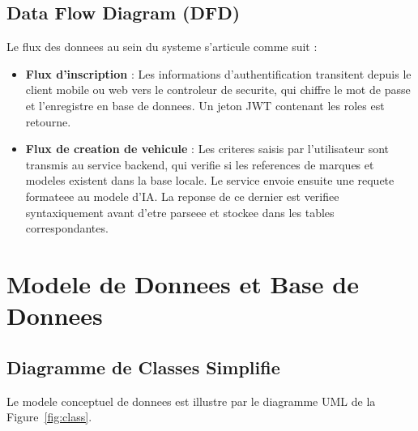\documentclass[11pt,a4paper]{report}
\begin{document}
\section{Data Flow Diagram (DFD)}
Le flux des donnees au sein du systeme s'articule comme suit :
\begin{itemize}[label=\textbullet]
    \item \textbf{Flux d'inscription} : Les informations d'authentification transitent depuis le client mobile ou web vers le controleur de securite, qui chiffre le mot de passe et l'enregistre en base de donnees. Un jeton JWT contenant les roles est retourne.
    \item \textbf{Flux de creation de vehicule} : Les criteres saisis par l'utilisateur sont transmis au service backend, qui verifie si les references de marques et modeles existent dans la base locale. Le service envoie ensuite une requete formateee au modele d'IA. La reponse de ce dernier est verifiee syntaxiquement avant d'etre parseee et stockee dans les tables correspondantes.
\end{itemize}

\chapter{Modele de Donnees et Base de Donnees}

\section{Diagramme de Classes Simplifie}
Le modele conceptuel de donnees est illustre par le diagramme UML de la Figure~\ref{fig:class}.
\end{document}
